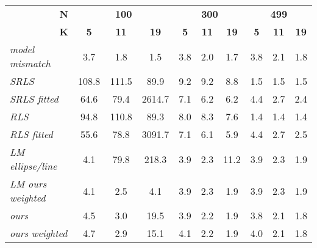 \begin{tabular}{l|ccc|ccc|ccc|}
\toprule
\multicolumn{1}{r|}{\textbf{N}} & \multicolumn{3}{c|}{\textbf{100}} & \multicolumn{3}{c|}{\textbf{300}} & \multicolumn{3}{c|}{\textbf{499}} \\
\multicolumn{1}{r|}{\textbf{K}} &   \textbf{5} &   \textbf{11}&    \textbf{19}& \textbf{5} & \textbf{11}&  \textbf{19}& \textbf{5} & \textbf{11}& \textbf{19}\\
\midrule
\textit{model mismatch  } &   3.7 &   1.8 &    \cellcolor{\secondcolor}1.5 & 3.8 & 2.0 &  1.7 & 3.8 & 2.1 & 1.8 \\
\midrule \textit{SRLS            } & 108.8 & 111.5 &   89.9 & 9.2 & 9.2 &  8.8 & \cellcolor{\secondcolor}1.5 & \cellcolor{\secondcolor}1.5 & \cellcolor{\secondcolor}1.5 \\
\textit{SRLS fitted     } &  64.6 &  79.4 & 2614.7 & 7.1 & 6.2 &  6.2 & 4.4 & 2.7 & 2.4 \\
\textit{RLS             } &  94.8 & 110.8 &   89.3 & 8.0 & 8.3 &  7.6 & \cellcolor{\firstcolor}1.4 & \cellcolor{\firstcolor}1.4 & \cellcolor{\firstcolor}1.4 \\
\textit{RLS fitted      } &  55.6 &  78.8 & 3091.7 & 7.1 & 6.1 &  \cellcolor{\secondcolor}5.9 & 4.4 & 2.7 & \cellcolor{\firstcolor}2.5 \\
\textit{LM ellipse/line } &   \cellcolor{\firstcolor}4.1 &  79.8 &  218.3 & \cellcolor{\firstcolor}3.9 & \cellcolor{\secondcolor}2.3 & 11.2 & \cellcolor{\firstcolor}3.9 & \cellcolor{\secondcolor}2.3 & \cellcolor{\firstcolor}1.9 \\
\textit{LM ours weighted} &   \cellcolor{\firstcolor}4.1 &   \cellcolor{\firstcolor}2.5 &    \cellcolor{\firstcolor}4.1 & \cellcolor{\firstcolor}3.9 & \cellcolor{\secondcolor}2.3 &  \cellcolor{\firstcolor}1.9 & \cellcolor{\firstcolor}3.9 & \cellcolor{\secondcolor}2.3 & \cellcolor{\firstcolor}1.9 \\
\textit{ours            } &   \cellcolor{\secondcolor}4.5 &   3.0 &   19.5 & \cellcolor{\firstcolor}3.9 & \cellcolor{\firstcolor}2.2 &  \cellcolor{\firstcolor}1.9 & 3.8 & 2.1 & 1.8 \\
\textit{ours weighted   } &   4.7 &   \cellcolor{\secondcolor}2.9 &   \cellcolor{\secondcolor}15.1 & \cellcolor{\firstcolor}4.1 & \cellcolor{\firstcolor}2.2 &  \cellcolor{\firstcolor}1.9 & 4.0 & 2.1 & 1.8 \\
\bottomrule
\end{tabular}
